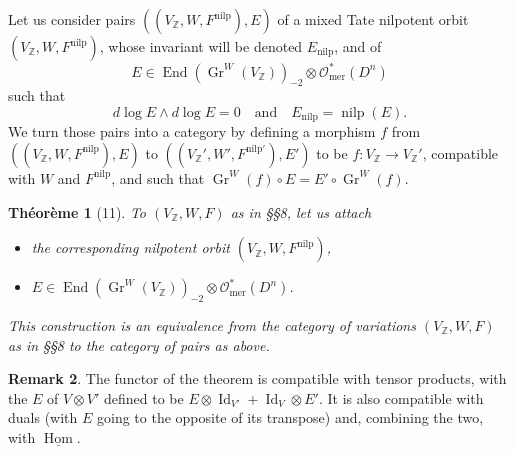 \documentclass[11pt,a4paper]{article}
\theoremstyle{plain}
\newtheorem{theorem}{Th\'eor\`eme}
\theoremstyle{definition}
\newtheorem{remark}[theorem]{Remark}
\DeclareMathOperator{\Hom}{Hom}
\DeclareMathOperator{\End}{End}
\DeclareMathOperator{\Gr}{Gr}
\DeclareMathOperator{\Id}{Id}
\DeclareMathOperator{\nilp}{nilp}
\begin{document}
Let us consider pairs $((V_{\mathbb{Z}}, W, F^{\text{nilp}}), E)$ of a mixed Tate nilpotent orbit $(V_{\mathbb{Z}}, W, F^{\text{nilp}})$, whose invariant will be denoted $E_{\text{nilp}}$, and of
\[
E \in \End(\Gr^{W}(V_{\mathbb{Z}}))_{-2} \otimes \mathcal{O}_{\text{mer}}^{*}(D^{n})
\]
such that
\[
d\log E \wedge d\log E = 0 \quad \text{and} \quad E_{\text{nilp}} = \nilp(E).
\]
We turn those pairs into a category by defining a morphism $f$ from $((V_{\mathbb{Z}}, W, F^{\text{nilp}}), E)$ to $((V_{\mathbb{Z}}', W', F^{\text{nilp}\prime}), E')$ to be $f: V_{\mathbb{Z}} \to V_{\mathbb{Z}}'$, compatible with $W$ and $F^{\text{nilp}}$, and such that $\Gr^{W}(f) \circ E = E' \circ \Gr^{W}(f)$.

\begin{theorem}[11]
To $(V_{\mathbb{Z}}, W, F)$ as in \S\S 8, let us attach
\begin{itemize}
\item[(a)] the corresponding nilpotent orbit $(V_{\mathbb{Z}}, W, F^{\text{nilp}})$,
\item[(b)] $E \in \End(\Gr^{W}(V_{\mathbb{Z}}))_{-2} \otimes \mathcal{O}_{\text{mer}}^{*}(D^{n})$.
\end{itemize}
This construction is an equivalence from the category of variations $(V_{\mathbb{Z}}, W, F)$ as in \S\S 8 to the category of pairs as above.
\end{theorem}

\begin{remark}
The functor of the theorem is compatible with tensor products, with the $E$ of $V \otimes V'$ defined to be $E \otimes \Id_{V'} + \Id_{V} \otimes E'$. It is also compatible with duals (with $E$ going to the opposite of its transpose) and, combining the two, with $\underline{\Hom}$.
\end{remark}
\end{document}
